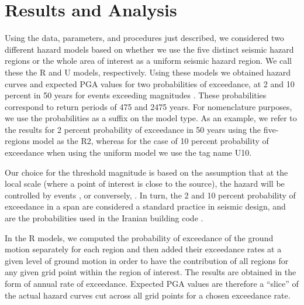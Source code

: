 

\section{Results and Analysis}

Using the data, parameters, and procedures just described, we considered two different hazard models based on whether we use the five distinct seismic hazard regions or the whole area of interest as a uniform seismic hazard region. We call these the R and U models, respectively. Using these models we obtained hazard curves and expected PGA values for two probabilities of exceedance, at 2 and 10 percent in 50 years for events exceeding magnitudes . These probabilities correspond to return periods of 475 and 2475 years. For nomenclature purposes, we use the probabilities as a suffix on the model type. As an example, we refer to the results for 2 percent probability of exceedance in 50 years using the five-regions model as the R2, whereas for the case of 10 percent probability of exceedance when using the uniform model we use the tag name U10.

Our choice for the threshold magnitude is based on the assumption that at the local scale (where a point of interest is close to the source), the hazard will be controlled by events , or conversely, . In turn, the 2 and 10 percent probability of exceedance in a  span are considered a standard practice in seismic design, and are the probabilities used in the Iranian building code \citep{BHRC2014}.

In the R models, we computed the probability of exceedance of the ground motion separately for each region and then added their exceedance rates at a given level of ground motion in order to have the contribution of all regions for any given grid point within the region of interest. The results are obtained in the form of annual rate of exceedance. Expected PGA values are therefore a ``slice'' of the actual hazard curves cut across all grid points for a chosen exceedance rate.

